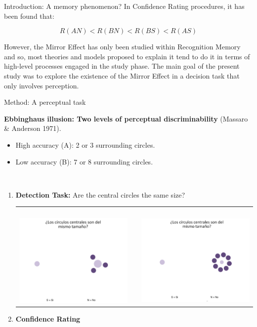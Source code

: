 \documentclass[final]{beamer}
\newlength{\onecolwid}
\begin{document}
\begin{frame}[t]
\begin{columns}[t]
\begin{column}{\onecolwid}
\begin{alertblock}{Introduction: A memory phenomenon?}
In Confidence Rating procedures, it has been found that:

\begin{equation}
R(AN) < R(BN) < R(BS) < R(AS)
\label{eqn:Confidence}
\end{equation}

However, the Mirror Effect has only been studied within Recognition Memory and so, most theories and models proposed to explain it tend to do it in terms of high-level processes engaged in the study phase. The main goal of the present study was to explore the existence of the Mirror Effect in a decision task that only involves perception.
\end{alertblock}



\begin{alertblock}{Method: A perceptual task}

\textbf{Ebbinghaus illusion: Two levels of perceptual discriminability} (Massaro \& Anderson  1971).

\begin{itemize}
\item High accuracy (A): 2 or 3 surrounding circles.
\item Low accuracy (B): 7 or 8 surrounding circles.
\end{itemize}

$\quad$
\begin{enumerate}
\item \textbf{Detection Task:} Are the central circles the same size?
\begin{tabular}{ccc}
$\qquad$ \includegraphics[width=0.35\linewidth]{Figures/MainTask.png} & \hfill & $\qquad$\includegraphics[width=0.35\linewidth]{Figures/MainTask2.png}
\end{tabular}
\item \textbf{Confidence Rating}
\end{enumerate}
$\qquad$


\end{alertblock}
\end{column}
\end{columns}
\end{frame}
\end{document}
